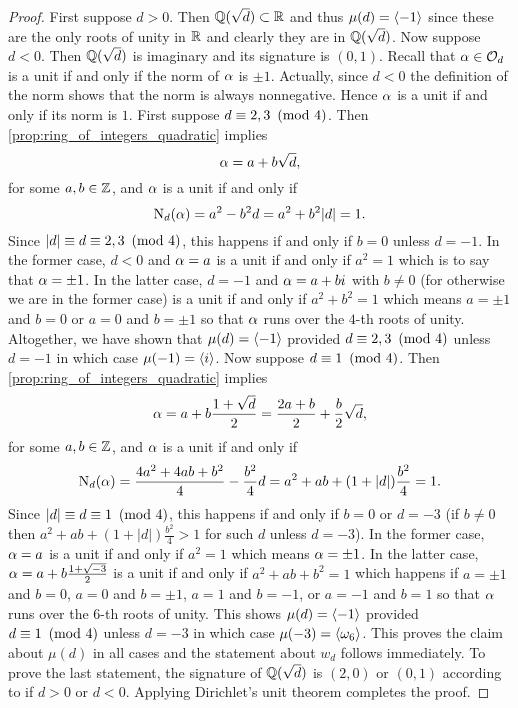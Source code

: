     \begin{proof}
        First suppose $d > 0$. Then $\mathbb{Q}(\sqrt{d}) \subset \mathbb{R}$ and thus $\mu(d) = \langle-1\rangle$ since these are the only roots of unity in $\mathbb{R}$ and clearly they are in $\mathbb{Q}(\sqrt{d})$. Now suppose $d < 0$. Then $\mathbb{Q}(\sqrt{d})$ is imaginary and its signature is $(0,1)$. Recall that $\alpha \in \mathcal{O}_{d}$ is a unit if and only if the norm of $\alpha$ is $\pm 1$. Actually, since $d < 0$ the definition of the norm shows that the norm is always nonnegative. Hence $\alpha$ is a unit if and only if its norm is $1$. First suppose $d \equiv 2,3 \ \left(\text{mod }4\right)$. Then \cref{prop:ring_of_integers_quadratic} implies
      \[
        \alpha = a+b\sqrt{d},
      \]
      for some $a,b \in \mathbb{Z}$, and $\alpha$ is a unit if and only if
      \[
        \operatorname{\mathrm{N}}_{d}(\alpha) = a^{2}-b^{2}d = a^{2}+b^{2}|d| = 1.
      \]
      Since $|d| \equiv d \equiv 2,3 \ \left(\text{mod }4\right)$, this happens if and only if $b = 0$ unless $d = -1$. In the former case, $d < 0$ and $\alpha = a$ is a unit if and only if $a^{2} = 1$ which is to say that $\alpha = \pm 1$. In the latter case, $d = -1$ and $\alpha = a+bi$ with $b \neq 0$ (for otherwise we are in the former case) is a unit if and only if $a^{2}+b^{2} = 1$ which means $a = \pm1$ and $b = 0$ or $a = 0$ and $b = \pm 1$ so that $\alpha$ runs over the $4$-th roots of unity. Altogether, we have shown that $\mu(d) = \langle-1\rangle$ provided $d \equiv 2,3 \ \left(\text{mod }4\right)$ unless $d = -1$ in which case $\mu(-1) = \langle i\rangle$. Now suppose $d \equiv 1 \ \left(\text{mod }4\right)$. Then \cref{prop:ring_of_integers_quadratic} implies
      \[
        \alpha = a+b\frac{1+\sqrt{d}}{2} = \frac{2a+b}{2}+\frac{b}{2}\sqrt{d},
      \]
      for some $a,b \in \mathbb{Z}$, and $\alpha$ is a unit if and only if
      \[
        \operatorname{\mathrm{N}}_{d}(\alpha) = \frac{4a^{2}+4ab+b^{2}}{4}-\frac{b^{2}}{4}d = a^{2}+ab+(1+|d|)\frac{b^{2}}{4} = 1.
      \]
      Since $|d| \equiv d \equiv 1 \ \left(\text{mod }4\right)$, this happens if and only if $b = 0$ or $d = -3$ (if $b \neq 0$ then $a^{2}+ab+(1+|d|)\frac{b^{2}}{4} > 1$ for such $d$ unless $d = -3$). In the former case, $\alpha = a$ is a unit if and only if $a^{2} = 1$ which means $\alpha = \pm1$. In the latter case, $\alpha = a+b\frac{1+\sqrt{-3}}{2}$ is a unit if and only if $a^{2}+ab+b^{2} = 1$ which happens if $a = \pm 1$ and $b = 0$, $a = 0$ and $b = \pm 1$, $a = 1$ and $b = -1$, or $a = -1$ and $b = 1$ so that $\alpha$ runs over the $6$-th roots of unity. This shows $\mu(d) = \langle-1\rangle$ provided $d \equiv 1 \ \left(\text{mod }4\right)$ unless $d = -3$ in which case $\mu(-3) = \langle\omega_{6}\rangle$. This proves the claim about $\mu(d)$ in all cases and the statement about $w_{d}$ follows immediately. To prove the last statement, the signature of $\mathbb{Q}(\sqrt{d})$ is $(2,0)$ or $(0,1)$ according to if $d > 0$ or $d < 0$. Applying Dirichlet's unit theorem completes the proof.
    \end{proof}

